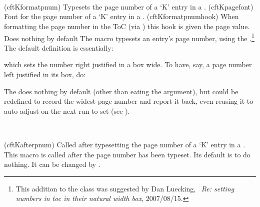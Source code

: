\begin{syntax}
\cmd{\cftKformatpnum} \\
\cmd{\cftKformatpnumhook}\\
\cmd{\cftKpagefont} \\
\end{syntax}
\glossary(cftKformatpnum)%
  {}%
  {Typesets the page number  of a  `K' entry in a \listofx.} 
\glossary(cftKpagefont)%
  {}%
  {Font for the page number of a  `K' entry in a \listofx.} 
\glossary(cftKformatpnumhook)%
 {}%
 {When formatting the page number in the ToC (via
   ) this hook is given the page value. Does nothing by default}%
The macro \cmd{\cftKformatpnum} typesets an entry's page number, using
the \cmd{\cftKpagefont}.\footnote{This addition to the class was suggested
by Dan Luecking, \ctt\ \textit{Re: setting numbers in toc in their natural width box,} 2007/08/15.}
The default definition is essentially:
\begin{lcode}
\newcommand*{\cftKformatpnum}[1]{%
  \cftKformatpnumhook{#1}%
  \hbox to \@pnumwidth{\hfil{\cftKpagefont #1}}}
\end{lcode}
which sets the number right justified in a box \lnc{\@pnumwidth} wide.
To have, say, a \cmd{\part} page number left justified in its box, do:
\begin{lcode}
\renewcommand*{\cftpartformatpnum}[1]{%
  \cftpartformatpnumhook{#1}%
  \hbox to \@pnumwidth{{\cftpartpagefont #1}}}
\end{lcode}
The \cmd{\cftKformatpnumhook} does nothing by default (other than
eating the argument), but could be redefined to record the widest page
number and report it back, even reusing it to auto adjust on the next
run to set  (see \cmd{\setpnumwidth}).


\begin{syntax}
\cmd{\cftKafterpnum} \\
\end{syntax}
\glossary(cftKafterpnum)
  {}%
  {Called after typesetting the page number of a  `K' entry in a \listofx.} 
 This macro is called after the page number has been typeset. Its default
 is to do nothing. It can be changed by \cmd{\renewcommand}.

